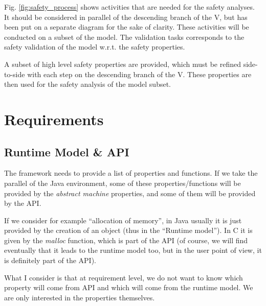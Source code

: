 \documentclass{template/openetcs_article}
\begin{document}
Fig. \ref{fig:safety_process} shows activities that are needed for the safety analyses. It should 
be considered in parallel of the descending branch of the V, but has been put on a separate diagram for
the sake of clarity. These activities will be conducted on a subset of the model.
The validation tasks corresponds to the safety validation of the model w.r.t. 
the safety properties.

A subset of high level safety properties are provided, 
which must be refined side-to-side with each step on the 
descending branch of the V. These properties are then used for the safety analysis of the model subset.

\section{Requirements}
\subsection{Runtime Model \& API}
The framework needs to provide a list of properties and functions. If we take the parallel of the Java environment, 
some of these properties/functions will be provided by the \emph{abstract machine} properties, and some of them will 
be provided by the API.

If we consider for example ``allocation of memory'', in Java usually it is just provided by the creation of an object 
(thus in the ``Runtime model''). In C it is given by the \emph{malloc} function, which is part of the API (of course, 
we will find eventually that it leads to the runtime model too, but in the user point of view, it is
definitely part of the API).

What I consider is that at requirement level, we do not want to know which property will come from API and which will 
come from the runtime model. We are only interested in the properties themselves.
\end{document}
